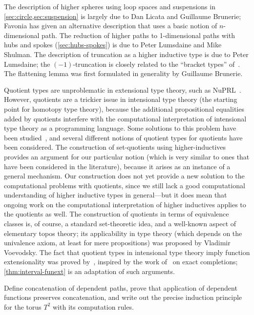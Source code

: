 The description of higher spheres using loop spaces and suspensions in \autoref{sec:circle,sec:suspension} is largely due to Dan Licata and Guillaume Brunerie; Favonia has given an alternative description that uses a basic notion of $n$-dimensional path.
The reduction of higher paths to 1-dimensional paths with hubs and spokes (\autoref{sec:hubs-spokes}) is due to Peter Lumsdaine and Mike Shulman.
The description of truncation as a higher inductive type is due to Peter Lumsdaine; the $(-1)$-truncation is closely related to the ``bracket types'' of~\cite{ab:bracket-types}.
The flattening lemma was first formulated in generality by Guillaume Brunerie.

Quotient types are unproblematic in extensional type theory, such as NuPRL~\citep{constable+86nuprl-book}.  However, quotients are a trickier issue in intensional type theory (the starting point for homotopy type theory), because the additional propositional equalities added by quotients interfere with the computational interpretation of intensional type theory as a programming language. Some solutions to this problem have been studied~\cite{hofmann:thesis,altenkirch99extensional,altenkirch+07ott}, and several different notions of quotient types for quotients have been considered.  The construction of set-quotients using higher-inductives provides an argument for our particular notion (which is very similar to ones that have been considered in the literature), because it arises as an instance of a general mechanism.  Our construction does not yet provide a new solution to the computational problems with quotients,
since we still lack a good computational understanding of
higher inductive types in general---but it does mean that ongoing work on the computational interpretation of higher inductives applies to the quotients as well.  The construction of quotients in terms of equivalence classes is, of
course, a standard set-theoretic idea, and a well-known aspect of
elementary topos theory; its applicability in type theory (which depends
on the univalence axiom, at least for mere propositions) was proposed by
Vladimir Voevodsky.  The fact that quotient types in intensional type theory imply function extensionality was proved by~\cite{hofmann:thesis}, inspired by the work of~\cite{carboni} on exact completions; \autoref{thm:interval-funext} is an adaptation of such arguments.

\sectionExercises

\begin{ex}\label{ex:torus}
  Define concatenation of dependent paths, prove that application of dependent functions preserves concatenation, and write out the precise induction principle for the torus $T^2$ with its computation rules.
\end{ex}

